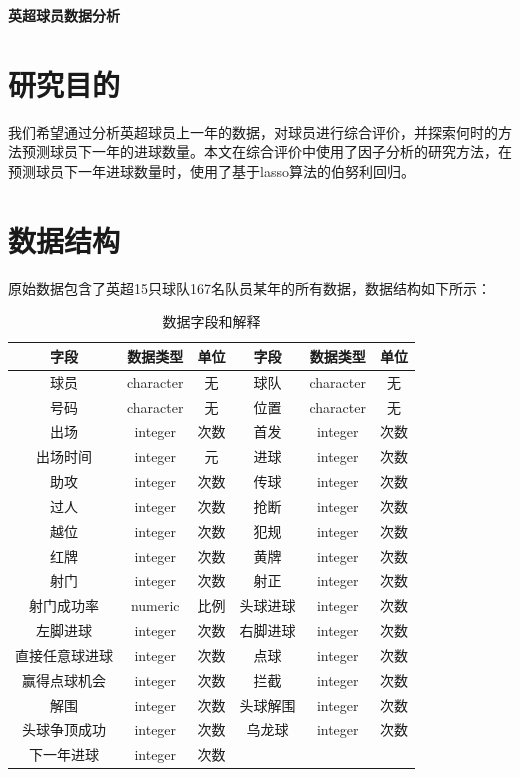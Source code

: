 \documentclass[12pt,a4paper,onecolumn]{article}
\begin{document}

\begin{center}
\begin{Huge}
\textbf{英超球员数据分析}
\end{Huge}
\vskip 15mm
\end{center}

\section{研究目的}

我们希望通过分析英超球员上一年的数据，对球员进行综合评价，并探索何时的方法预测球员下一年的进球数量。本文在综合评价中使用了因子分析的研究方法，在预测球员下一年进球数量时，使用了基于lasso算法的伯努利回归。

\section{数据结构}

原始数据包含了英超15只球队167名队员某年的所有数据，数据结构如下所示：

\begin{table}[H]
\centering
\caption{数据字段和解释}
\begin{tabular}{cccccc}
  \hline
    字段 & 数据类型 & 单位 & 字段 & 数据类型 & 单位\\\hline
    球员 & character & 无 & 球队 & character & 无 \\
    号码 & character & 无  & 位置 & character & 无 \\
    出场 & integer & 次数 & 首发 & integer & 次数 \\
    出场时间 & integer & 元  & 进球 & integer & 次数 \\
    助攻 & integer & 次数  & 传球 & integer & 次数 \\
    过人 & integer & 次数  & 抢断 & integer & 次数 \\
    越位 & integer & 次数  & 犯规 & integer & 次数 \\
    红牌 & integer & 次数  & 黄牌 & integer & 次数 \\
    射门 & integer & 次数 & 射正 & integer & 次数 \\
		射门成功率 & numeric & 比例 & 头球进球 & integer & 次数 \\
    左脚进球 & integer & 次数 & 右脚进球 & integer & 次数 \\
    直接任意球进球 & integer & 次数 & 点球 & integer & 次数 \\
    赢得点球机会 & integer & 次数 & 拦截 & integer & 次数 \\
    解围 & integer & 次数 & 头球解围 & integer & 次数 \\
    头球争顶成功 & integer & 次数 & 乌龙球 & integer & 次数 \\
 下一年进球 & integer & 次数 & & & \\
    \hline
  \end{tabular}
\end{table}
\end{document}
